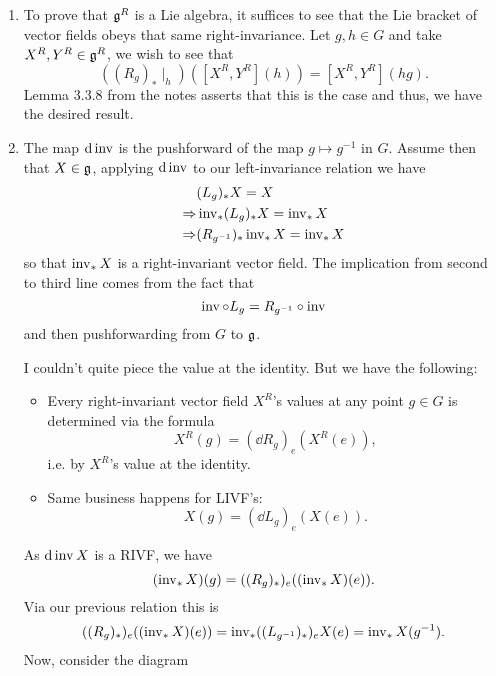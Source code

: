 \documentclass[12pt]{memoir}
\begin{document}
\begin{ptcbr}
	\begin{enumerate}
		\item To prove that $\mathfrak{g}^R$ is a Lie algebra, it suffices to see that the Lie bracket of vector fields obeys that same right-invariance. Let $g,h\in G$ and take $X^R,Y^R\in\mathfrak{g}^R$, we wish to see that 
		$$((R_g)_\ast\mid_h)([X^R,Y^R](h))=[X^R,Y^R](hg).$$
		Lemma 3.3.8 from the notes asserts that this is the case and thus, we have the desired result.
		\item The map $\dd\operatorname{inv}$ is the pushforward of the map $g\mapsto g^{-1}$ in $G$. Assume then that $X\in\mathfrak{g}$, applying $\dd\operatorname{inv}$ to our left-invariance relation we have
		\begin{align*}
			&(L_g)_\ast X=X\\
			\Rightarrow&\operatorname{inv}_\ast(L_g)_\ast X=\operatorname{inv}_\ast X\\
			\Rightarrow&(R_{g^{-1}})_\ast\operatorname{inv}_\ast X=\operatorname{inv}_\ast X
		\end{align*}
		so that $\operatorname{inv}_\ast X$ is a right-invariant vector field. The implication from second to third line comes from the fact that 
		$$\operatorname{inv}\circ L_g=R_{g^{-1}}\circ\operatorname{inv}$$
		and then pushforwarding from $G$ to $\mathfrak{g}$.\par
		I couldn't quite piece the value at the identity. But we have the following:
		\begin{itemize}
			\item Every right-invariant vector field $X^R$'s values at any point $g\in G$ is determined via the formula 
			$$X^R(g)=(\dd R_g)_e(X^R(e)),$$
			i.e. by $X^R$'s value at the identity.
			\item Same business happens for LIVF's: 
			$$X(g)=(\dd L_g)_e(X(e)).$$
		\end{itemize}
		As $\dd \operatorname{inv} X$ is a RIVF, we have 
		$$(\operatorname{inv}_\ast X)(g)=((R_g)_\ast)_e((\operatorname{inv}_\ast X)(e)).$$
		Via our previous relation this is 
		$$((R_g)_\ast)_e((\operatorname{inv}_\ast X)(e))= \operatorname{inv}_\ast ( (L_{g^{-1}})_\ast)_e X(e)=\operatorname{inv}_\ast X(g^{-1}).$$
		Now, consider the diagram
		\begin{center}
\end{center}
\end{enumerate}
\end{ptcbr}
\end{document}
